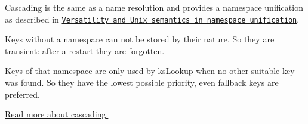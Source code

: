 Cascading is the same as a name resolution and provides a namespace unification as described in \href{http://dl.acm.org/citation.cfm?id=1138045}{\tt Versatility and Unix semantics in namespace unification}.

Keys without a namespace can not be stored by their nature. So they are transient\+: after a restart they are forgotten.

Keys of that namespace are only used by ks\+Lookup when no other suitable key was found. So they have the lowest possible priority, even fallback keys are preferred.

\hyperlink{md_doc_help_elektra-cascading_doc_help_elektra-cascading_md}{Read more about cascading.} 